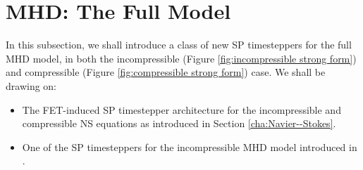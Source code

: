 \section{MHD: The Full Model}
    In this subsection, we shall introduce a class of new SP timesteppers for the full MHD model, in both the incompressible (Figure \ref{fig:incompressible strong form}) and compressible (Figure \ref{fig:compressible strong form}) case. We shall be drawing on:
    \begin{itemize}
        \item  The FET-induced SP timestepper architecture for the incompressible and compressible NS equations as introduced in Section \ref{cha:Navier--Stokes}.
        \item  One of the SP timesteppers for the incompressible MHD model introduced in \cite{Laakmann_Hu_Farrell_2022}.
    \end{itemize}


    
    
